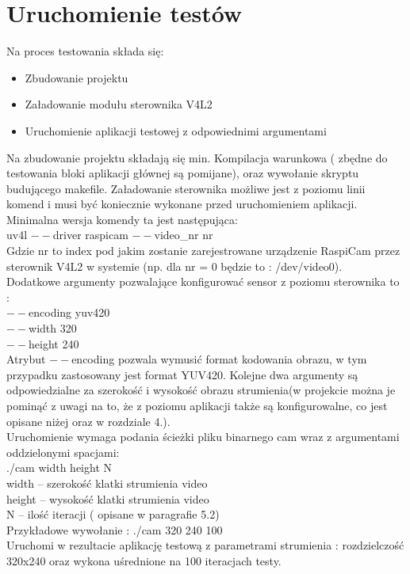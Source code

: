 \section{Uruchomienie testów}
\begin{description}
\item Na proces testowania składa się:
\begin{itemize}[noitemsep]
\item Zbudowanie projektu 
\item Załadowanie modułu sterownika V4L2
\item Uruchomienie aplikacji testowej z odpowiednimi argumentami
\end{itemize}
\end{description}
Na zbudowanie projektu składają się min. Kompilacja warunkowa ( zbędne do testowania bloki aplikacji głównej są pomijane), oraz wywołanie skryptu budującego makefile.
Załadowanie sterownika możliwe jest z poziomu linii komend i musi być koniecznie wykonane przed uruchomieniem aplikacji. Minimalna wersja komendy ta jest następująca:\\
uv4l $--$driver raspicam $--$video\_nr nr\\
Gdzie nr to index pod jakim zostanie zarejestrowane urządzenie RaspiCam przez sterownik V4L2 w systemie (np. dla nr = 0 będzie to : /dev/video0).\\
Dodatkowe argumenty pozwalające konfigurować sensor z poziomu sterownika to :\\
$--$encoding yuv420\\
$--$width 320\\
$--$height 240\\
Atrybut $--$encoding pozwala wymusić format kodowania obrazu, w tym przypadku zastosowany jest format YUV420. Kolejne dwa argumenty są odpowiedzialne za szerokość i wysokość obrazu strumienia(w projekcie można je pominąć z  uwagi na to, że z poziomu aplikacji także są konfigurowalne, co jest opisane niżej oraz w rozdziale 4.).\\  
Uruchomienie wymaga podania ścieżki pliku binarnego cam wraz z argumentami oddzielonymi spacjami:\\
./cam width height N\\
width – szerokość klatki strumienia video\\
height – wysokość klatki strumienia video\\
N – ilość iteracji ( opisane w paragrafie 5.2)\\
Przykładowe wywołanie : ./cam 320 240 100\\
Uruchomi w rezultacie aplikację testową z parametrami strumienia : rozdzielczość 320x240 oraz wykona uśrednione na 100 iteracjach testy.

